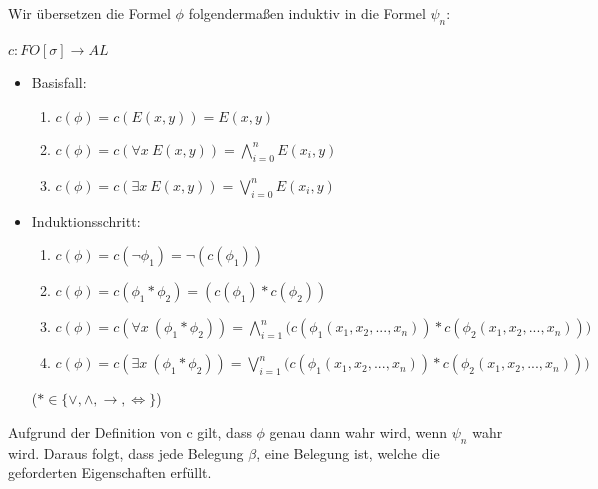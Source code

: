 \documentclass[a4paper,10pt]{article}
\begin{document}
Wir übersetzen die Formel $\phi$ folgendermaßen induktiv in die Formel $\psi_n$: \\
\ \\
$c: FO[\sigma] \rightarrow AL$ 
\begin{itemize}
	\item 	Basisfall: 
		\begin{enumerate}
		\setlength{\itemindent}{2em}
		\item  $c(\phi) = c(E(x,y)) = E(x,y)$
		\item  $c(\phi) = c(\forall x~ E(x,y)) = \bigwedge\limits_{i = 0}^n E(x_i,y)$ 
		\item  $c(\phi) = c(\exists x~ E(x,y)) = \bigvee\limits_{i = 0}^n E(x_i,y)$
		\end{enumerate}
	\item 	Induktionsschritt: 
		\begin{enumerate}
		\setlength{\itemindent}{2em}
		\item  $c(\phi) = c(\lnot\phi_1) = \lnot (c(\phi_1))$
		\item   $c(\phi) = c(\phi_1 * \phi_2) = (c(\phi_1) * c(\phi_2))$
		\item  $c(\phi) = c(\forall x~(\phi_1 * \phi_2)) = 
		\bigwedge\limits_{i = 1}^n \Big( c(\phi_1(x_1,x_2,...,x_n)) * c(\phi_2(x_1,x_2,...,x_n)) \Big)$ 
		\item  $c(\phi) = c(\exists x~(\phi_1 * \phi_2)) = 
		\bigvee\limits_{i = 1}^n \Big( c(\phi_1(x_1,x_2,...,x_n)) * c(\phi_2(x_1,x_2,...,x_n)) \Big)$ \\
		\end{enumerate}
		($* \in \{\lor, \land, \rightarrow, \Leftrightarrow\}$)
\end{itemize}

Aufgrund der Definition von c gilt, dass $\phi$ genau dann wahr wird, wenn $\psi_n$ wahr wird. Daraus folgt, dass jede Belegung $\beta$, 
eine Belegung ist, welche die geforderten Eigenschaften erfüllt.
\end{document}

